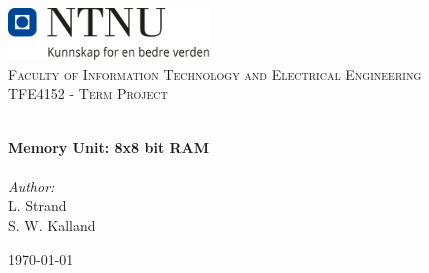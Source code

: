 
\begin{titlepage}
\vbox{ }
\vbox{ }
\begin{center}
\includegraphics[width=0.40\textwidth]{LaTeX/Images/NTNU_logo.png}\\[1cm]
\textsc{\LARGE Faculty of Information Technology and Electrical Engineering} \\[1.5cm]
\textsc{\Large TFE4152 - Term Project}\\[0.5cm]
\vbox{ }

\HRule \\[0.4cm]
{ \huge \bfseries Memory Unit: 8x8 bit RAM}\\[0.4cm]
\HRule \\[1.5cm]

\large
\emph{Author:}\\[0.5cm]
L. Strand   \\
S. W. Kalland
\vfill

{\large \today}
\end{center}
\end{titlepage}